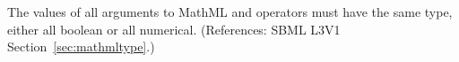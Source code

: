 The values of all arguments to MathML  and  operators
must have the same type, either all boolean or all numerical.  (References:
SBML L3V1 Section~\ref{sec:mathmltype}.)
